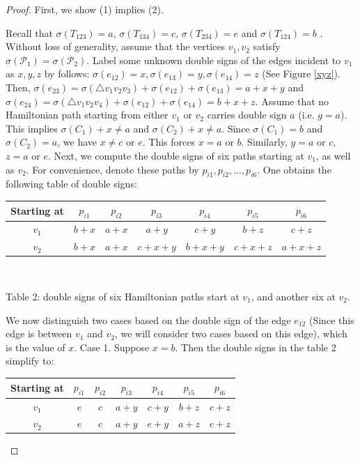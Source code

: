 \documentclass[12pt]{amsart}
\theoremstyle{plain}
\theoremstyle{definition}%
\begin{document}
\begin{proof} First, we show (1) implies (2).

Recall that $\sigma(T_{123})=a$, $\sigma(T_{134})=c$, $\sigma(T_{234})=e$ and $\sigma(T_{124})=b$ .
 Without loss of generality, assume that the vertices $v_1,v_2$ satisfy $\sigma(\mathscr{P}_1)=\sigma(\mathscr{P}_2)$.  Label some unknown double signs of the edges incident to $v_1$ as $x,y,z$ by follows:  $\sigma(e_{12})=x, \sigma(e_{13})=y, \sigma(e_{14})=z$ (See Figure \ref{xyz}). Then, $\sigma(e_{23})=\sigma(\triangle v_1v_2v_3)+\sigma(e_{12})+\sigma(e_{13})=a+x+y$ and $\sigma(e_{24})=\sigma(\triangle v_1v_2v_4)+\sigma(e_{12})+\sigma(e_{14})=b+x+z$. Assume that no Hamiltonian path starting from either \(v_1\) or \(v_2\) carries double sign \(a\) (i.e. $g=a$). This implies $\sigma(C_1)+x\neq a$ and $\sigma(C_2)+x\neq a$.   Since $\sigma(C_1)=b$ and  $\sigma(C_2)=a$, we have $x\neq c$ or $e$. 
 This forces $x=a$ or $b$. Similarly, $y=a$ or $c$, $z=a$ or $e$.  Next, we compute the double signs of six paths starting at $v_1$, as well as $v_2$. For convenience, denote these paths by $p_{i1},p_{i2},...,p_{i6}$. One obtains the following table of double signs:

\begin{center}
\begin{tabular}{||c| c| c |c| c |c |c||} 
 \hline
 Starting at & $p_{i1}$ & $p_{i2}$ & $p_{i3}$ & $p_{i4}$ & $p_{i5}$ & $p_{i6}$\\ [0.5ex] 
 \hline\hline
 $v_1$ & $b+x$ & $a+x$&$a+y$ &$c+y$& $b+z$&$c+z$ \\ 
 \hline
 $v_2$ & $b+x$ & $a+x$ & $c+x+y$&$b+x+y$&$c+x+z$&$a+x+z$ \\
 [1ex] 
 \hline
\end{tabular}\\
\end{center}
\begin{center}
   

 Table 2: double signs of six Hamiltonian paths start at $v_1$, and another six at $v_2$.
\end{center}
We now distinguish two cases based on the double sign of the edge $e_{12}$ (Since this edge is between $v_1$ and $v_2$, we will consider two cases based on this edge), which is the value of  
$x$. 
Case 1. 
 Suppose $x=b$. Then the double signs in the table 2 simplify to:
\begin{center}
\begin{tabular}{||c| c| c |c| c |c |c||} 
 \hline
 Starting at & $p_{i1}$ & $p_{i2}$ & $p_{i3}$ &$p_{i4}$&$p_{i5}$&$p_{i6}$\\ [0.5ex] 
 \hline\hline
 $v_1$ & $e$ & $c$&$a+y$ &$c+y$& $b+z$&$c+z$ \\ 
 \hline
$ v_2$ & $e$ & $c$ & $a+y$&$e+y$&$a+z$&$c+z$ \\
 [1ex] 
 \hline
 

\end{tabular}
\end{center}
\end{proof}
\end{document}
